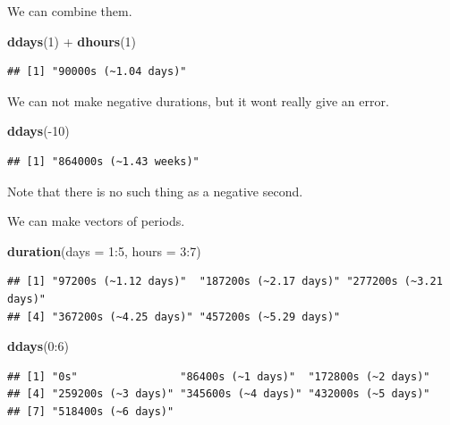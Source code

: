 \documentclass[]{tufte-book}
\newenvironment{Shaded}{}{}
\newcommand{\DataTypeTok}[1]{\textcolor[rgb]{0.56,0.13,0.00}{#1}}
\newcommand{\DecValTok}[1]{\textcolor[rgb]{0.25,0.63,0.44}{#1}}
\newcommand{\KeywordTok}[1]{\textcolor[rgb]{0.00,0.44,0.13}{\textbf{#1}}}
\newcommand{\NormalTok}[1]{#1}
\newcommand{\OperatorTok}[1]{\textcolor[rgb]{0.40,0.40,0.40}{#1}}
\newcommand{\StringTok}[1]{\textcolor[rgb]{0.25,0.44,0.63}{#1}}
\begin{document}
We can combine them.

\begin{Shaded}
\begin{Highlighting}[]
\KeywordTok{ddays}\NormalTok{(}\DecValTok{1}\NormalTok{) }\OperatorTok{+}\StringTok{ }\KeywordTok{dhours}\NormalTok{(}\DecValTok{1}\NormalTok{)}
\end{Highlighting}
\end{Shaded}

\begin{verbatim}
## [1] "90000s (~1.04 days)"
\end{verbatim}

We can not make negative durations, but it wont really give an error.

\begin{Shaded}
\begin{Highlighting}[]
\KeywordTok{ddays}\NormalTok{(}\OperatorTok{-}\DecValTok{10}\NormalTok{)}
\end{Highlighting}
\end{Shaded}

\begin{verbatim}
## [1] "864000s (~1.43 weeks)"
\end{verbatim}

Note that there is no such thing as a negative second.

We can make vectors of periods.

\begin{Shaded}
\begin{Highlighting}[]
\KeywordTok{duration}\NormalTok{(}\DataTypeTok{days =} \DecValTok{1}\OperatorTok{:}\DecValTok{5}\NormalTok{, }\DataTypeTok{hours =} \DecValTok{3}\OperatorTok{:}\DecValTok{7}\NormalTok{)}
\end{Highlighting}
\end{Shaded}

\begin{verbatim}
## [1] "97200s (~1.12 days)"  "187200s (~2.17 days)" "277200s (~3.21 days)"
## [4] "367200s (~4.25 days)" "457200s (~5.29 days)"
\end{verbatim}

\begin{Shaded}
\begin{Highlighting}[]
\KeywordTok{ddays}\NormalTok{(}\DecValTok{0}\OperatorTok{:}\DecValTok{6}\NormalTok{)}
\end{Highlighting}
\end{Shaded}

\begin{verbatim}
## [1] "0s"                "86400s (~1 days)"  "172800s (~2 days)"
## [4] "259200s (~3 days)" "345600s (~4 days)" "432000s (~5 days)"
## [7] "518400s (~6 days)"
\end{verbatim}
\end{document}
